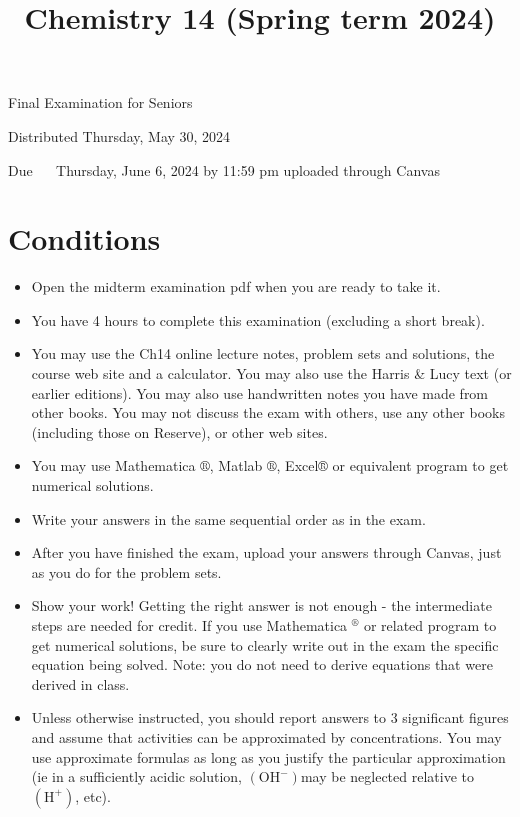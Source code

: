 \documentclass[12pt]{article}
\title{Chemistry 14 (Spring term 2024) }
\author{}
\date{}
\begin{document}
\maketitle
Final Examination for Seniors

Distributed Thursday, May 30, 2024

Due $\quad$ Thursday, June 6, 2024 by 11:59 pm uploaded through Canvas

\section*{Conditions}
\begin{itemize}
  \item Open the midterm examination pdf when you are ready to take it.

  \item You have 4 hours to complete this examination (excluding a short break).

  \item You may use the Ch14 online lecture notes, problem sets and solutions, the course web site and a calculator. You may also use the Harris \& Lucy text (or earlier editions). You may also use handwritten notes you have made from other books. You may not discuss the exam with others, use any other books (including those on Reserve), or other web sites.

  \item You may use Mathematica $®$, Matlab $®$, Excel® or equivalent program to get numerical solutions.

  \item Write your answers in the same sequential order as in the exam.

  \item After you have finished the exam, upload your answers through Canvas, just as you do for the problem sets.

  \item Show your work! Getting the right answer is not enough - the intermediate steps are needed for credit. If you use Mathematica ${ }^{\circledR}$ or related program to get numerical solutions, be sure to clearly write out in the exam the specific equation being solved. Note: you do not need to derive equations that were derived in class.

  \item Unless otherwise instructed, you should report answers to 3 significant figures and assume that activities can be approximated by concentrations. You may use approximate formulas as long as you justify the particular approximation (ie in a sufficiently acidic solution, $\left(\mathrm{OH}^{-}\right)$may be neglected relative to $\left(\mathrm{H}^{+}\right)$, etc).

\end{itemize}
\end{document}
